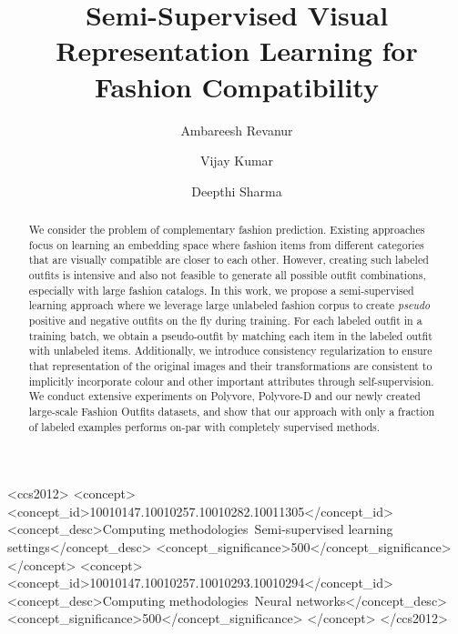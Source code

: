 \documentclass[sigconf]{acmart}
\begin{document}
\title{Semi-Supervised Visual Representation Learning for Fashion Compatibility}

\author{Ambareesh Revanur}

\author{Vijay Kumar}

\author{Deepthi Sharma}


\renewcommand{\shortauthors}{Ambareesh, Vijay and Deepthi}

\begin{abstract}
  We consider the problem of complementary fashion prediction. Existing approaches focus on learning an embedding space where fashion items from different categories that are visually compatible are closer to each other. However, creating such labeled outfits is intensive and also not feasible to generate all possible outfit combinations, especially with large  fashion catalogs. In this work, we propose a semi-supervised learning approach where we leverage large unlabeled fashion corpus to create {\em pseudo} positive and negative outfits on the fly during training. For each labeled outfit in a training batch, we obtain a pseudo-outfit by matching each item in the labeled outfit with unlabeled items. Additionally, we introduce consistency regularization to ensure that representation of the original images and their transformations are consistent to implicitly incorporate colour and other important attributes through self-supervision.  We conduct extensive experiments on Polyvore, Polyvore-D and our newly created large-scale Fashion Outfits datasets, and show that our approach with only a fraction of labeled examples performs on-par with completely supervised methods. \end{abstract}

\begin{CCSXML}
<ccs2012>
   <concept>
       <concept_id>10010147.10010257.10010282.10011305</concept_id>
       <concept_desc>Computing methodologies~Semi-supervised learning settings</concept_desc>
       <concept_significance>500</concept_significance>
       </concept>
   <concept>
       <concept_id>10010147.10010257.10010293.10010294</concept_id>
       <concept_desc>Computing methodologies~Neural networks</concept_desc>
       <concept_significance>500</concept_significance>
       </concept>
 </ccs2012>
\end{CCSXML}
\end{document}
